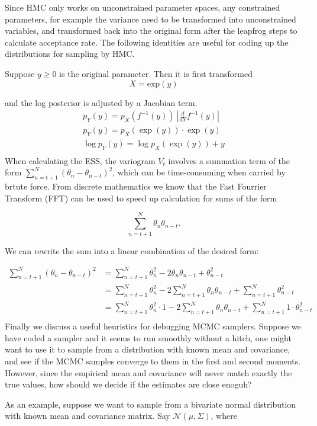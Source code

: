 \documentclass[12pt]{report}
\begin{document}
Since HMC only works on unconstrained parameter spaces, any constrained parameters, for example the variance need to be transformed into unconstrained variables, and transformed back into the original form after the leapfrog steps to calculate acceptance rate. The following identities are useful for coding up the distributions for sampling by HMC.

Suppose $y \ge 0 $ is the original parameter. Then it is first transformed
 \[ X = \text{exp}(y)  \]
 
 and the log posterior is adjusted by a Jacobian term.
\begin{align*}
p_Y(y) = p_X(f^{-1}(y)) \ |\frac{d}{dY} f^{-1}(y) |\\
p_Y(y) = p_X(\exp(y)) \cdot \exp(y) \\
\log p_Y(y) = \log p_X(\exp(y)) + y \\
\end{align*}
When calculating the ESS, the variogram $V_t$ involves a summation term of the form $\sum_{n=t+1}^N (\theta_{n} - \theta_{n-t})^2$, which can be time-consuming when carried by brtute force. From discrete mathematics we know that the Fast Fourrier Transform (FFT) can be used to speed up calculation for sums of the form 

\[ \sum_{n=t+1}^N \theta_n \theta_{n-t}.  \]

We can rewrite the sum into a linear combination of the desired form:

\begin{align*}
 \sum_{n=t+1}^N (\theta_{n} - \theta_{n-t})^2 &= \sum_{n=t+1}^N \theta_n^2 - 2 \theta_n \theta_{n-t} + \theta_{n-t}^2  \\
 &= \sum_{n=t+1}^N \theta_n^2 -2 \sum_{n=t+1}^N \theta_n \theta_{n-t} + \sum_{n=t+1}^N \theta_{n-t}^2 \\ 
  &= \sum_{n=t+1}^N  \theta_n^2 \cdot 1  -2 \sum_{n=t+1}^N \theta_n \theta_{n-t} + \sum_{n=t+1}^N 1 \cdot \theta_{n-t}^2 \\
\end{align*}
Finally we discuss a useful heuristics for debugging MCMC samplers. Suppose we have coded a sampler and it seems to run smoothly without a hitch, one might want to use it to sample from a distribution with known mean and covariance, and see if the MCMC samples converge to them in the first and second moments. However, since the empirical mean and covariance will never match exactly the true values, how should we decide if the estimates are close enoguh?


As an example, suppose we want to sample from a bivariate normal distribution with known mean and covariance matrix. Say $\mathcal{N}(\mu,\Sigma) $, where 
\end{document}
